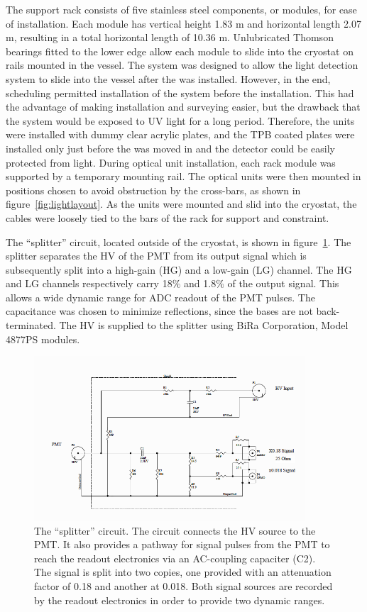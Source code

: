 The support rack consists of five stainless steel components, or modules, for ease of installation.  Each module has vertical height 1.83 m and horizontal length 2.07 m, resulting in a total horizontal length of 10.36 m.  Unlubricated Thomson bearings fitted to the lower edge allow each module to slide into the cryostat on rails mounted in the vessel.   The system was designed to allow the light detection system to slide into the vessel after the \lartpc was installed.  However, in the end, scheduling permitted installation of the system before the \lartpc installation.  This had the advantage of making installation and surveying easier, but the drawback that the system would be exposed to UV light for a long period.  Therefore, the units were installed with dummy clear acrylic plates, and the TPB coated plates were installed only just before the \lartpc was moved in and the detector could be easily protected from light.  During optical unit installation, each rack module was supported by a temporary mounting rail.  The optical units were then mounted in positions chosen to avoid obstruction by the \lartpc cross-bars, as shown in figure~\ref{fig:lightlayout}.  As the units were mounted and slid into the cryostat, the cables were loosely tied to the bars of the rack for support and constraint.  

The ``splitter'' circuit, located outside of the cryostat, is shown in figure~\ref{fig:splitter}. The splitter separates the HV of the PMT from its output signal which is subsequently split into a high-gain (HG) and a low-gain (LG) channel. The HG and LG channels respectively carry 18$\%$ and 1.8$\%$ of the output signal.  This allows a wide dynamic range for ADC readout of the PMT pulses.  The capacitance was chosen to minimize reflections, since the bases are not back-terminated.  The HV is supplied to the splitter using BiRa Corporation, Model 4877PS modules.

\begin{figure}
\centering 
\includegraphics[width=0.9\textwidth]{./figures/splitter_modified.png}
\caption{The ``splitter'' circuit.  The circuit connects the HV source to the PMT. It also provides a pathway for signal pulses from the PMT to reach the readout electronics via an AC-coupling capaciter (C2).  The signal is split into two copies, one provided with an attenuation factor of 0.18 and another at 0.018. Both signal sources are recorded by the readout electronics in order to provide two dynamic ranges.}
\label{fig:splitter}
\end{figure}


